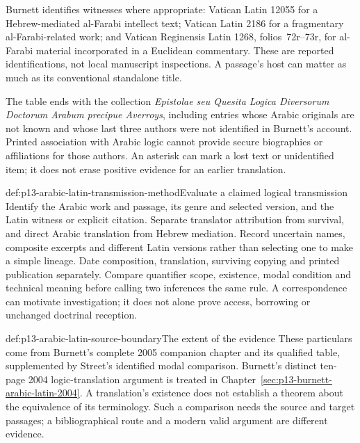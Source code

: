 Burnett identifies witnesses where appropriate: Vatican Latin
12055 for a Hebrew-mediated al-Farabi intellect text; Vatican
Latin 2186 for a fragmentary al-Farabi-related work; and Vatican
Reginensis Latin 1268, folios~72r--73r, for al-Farabi material
incorporated in a Euclidean commentary. These are reported
identifications, not local manuscript inspections. A passage's
host can matter as much as its conventional standalone title.
\cite[pp.~393--394, 402--403, notes~29 and 33]{Burnett2005ArabicLatinSupplement}

The table ends with the collection \emph{Epistolae seu Quesita
Logica Diversorum Doctorum Arabum precipue Averroys}, including
entries whose Arabic originals are not known and whose last
three authors were not identified in Burnett's account. Printed
association with Arabic logic cannot provide secure biographies
or affiliations for those authors. An asterisk can mark a lost
text or unidentified item; it does not erase positive evidence
for an earlier translation.
\cite[pp.~400, 404, note~68]{Burnett2005ArabicLatinSupplement}

\begin{hbmethod}{def:p13-arabic-latin-transmission-method}{Evaluate a claimed logical transmission}
Identify the Arabic work and passage, its genre and selected
version, and the Latin witness or explicit citation. Separate
translator attribution from survival, and direct Arabic
translation from Hebrew mediation. Record uncertain names,
composite excerpts and different Latin versions rather than
selecting one to make a simple lineage. Date composition,
translation, surviving copying and printed publication separately.
Compare quantifier scope, existence, modal condition and technical
meaning before calling two inferences the same rule. A
correspondence can motivate investigation; it does not alone
prove access, borrowing or unchanged doctrinal reception.
\end{hbmethod}

\begin{proofboundary}{def:p13-arabic-latin-source-boundary}{The extent of the evidence}
These particulars come from Burnett's complete 2005 companion
chapter and its qualified table, supplemented by Street's
identified modal comparison. Burnett's distinct ten-page 2004
logic-translation argument is treated in
Chapter~\ref{sec:p13-burnett-arabic-latin-2004}. A translation's existence does not
establish a theorem about the equivalence of its terminology.
Such a comparison needs the source and target passages;
a bibliographical route and a modern valid argument are
different evidence.
\end{proofboundary}

